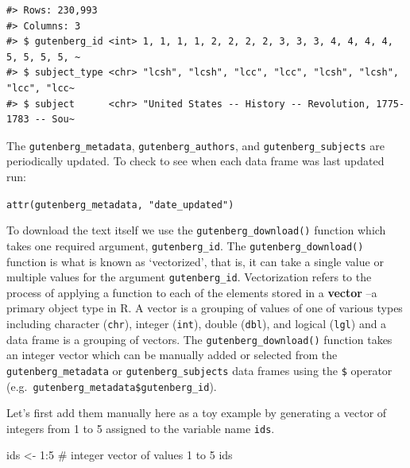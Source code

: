\documentclass[
  letterpaper,
]{latex/krantz}
\newenvironment{Shaded}{\begin{snugshade}}{\end{snugshade}}
\newcommand{\CommentTok}[1]{\textcolor[rgb]{0.37,0.37,0.37}{#1}}
\newcommand{\DecValTok}[1]{\textcolor[rgb]{0.68,0.00,0.00}{#1}}
\newcommand{\NormalTok}[1]{\textcolor[rgb]{0.00,0.23,0.31}{#1}}
\newcommand{\OtherTok}[1]{\textcolor[rgb]{0.00,0.23,0.31}{#1}}
\newcommand{\SpecialCharTok}[1]{\textcolor[rgb]{0.37,0.37,0.37}{#1}}
\begin{document}
\begin{verbatim}
#> Rows: 230,993
#> Columns: 3
#> $ gutenberg_id <int> 1, 1, 1, 1, 2, 2, 2, 2, 3, 3, 3, 4, 4, 4, 4, 5, 5, 5, 5, ~
#> $ subject_type <chr> "lcsh", "lcsh", "lcc", "lcc", "lcsh", "lcsh", "lcc", "lcc~
#> $ subject      <chr> "United States -- History -- Revolution, 1775-1783 -- Sou~
\end{verbatim}

\begin{tcolorbox}[enhanced jigsaw, toprule=.15mm, bottomtitle=1mm, coltitle=black, title=\textcolor{quarto-callout-warning-color}{\faExclamationTriangle}\hspace{0.5em}{Tip}, left=2mm, colframe=quarto-callout-warning-color-frame, bottomrule=.15mm, colbacktitle=quarto-callout-warning-color!10!white, leftrule=.75mm, colback=white, titlerule=0mm, breakable, toptitle=1mm, opacityback=0, arc=.35mm, rightrule=.15mm, opacitybacktitle=0.6]

The \texttt{gutenberg\_metadata}, \texttt{gutenberg\_authors}, and
\texttt{gutenberg\_subjects} are periodically updated. To check to see
when each data frame was last updated run:

\texttt{attr(gutenberg\_metadata,\ "date\_updated")}

\end{tcolorbox}

To download the text itself we use the \texttt{gutenberg\_download()}
function which takes one required argument, \texttt{gutenberg\_id}. The
\texttt{gutenberg\_download()} function is what is known as
`vectorized', that is, it can take a single value or multiple values for
the argument \texttt{gutenberg\_id}. Vectorization refers to the process
of applying a function to each of the elements stored in a
\textbf{vector} --a primary object type in R. A vector is a grouping of
values of one of various types including character (\texttt{chr}),
integer (\texttt{int}), double (\texttt{dbl}), and logical
(\texttt{lgl}) and a data frame is a grouping of vectors. The
\texttt{gutenberg\_download()} function takes an integer vector which
can be manually added or selected from the \texttt{gutenberg\_metadata}
or \texttt{gutenberg\_subjects} data frames using the \texttt{\$}
operator (e.g.~\texttt{gutenberg\_metadata\$gutenberg\_id}).

Let's first add them manually here as a toy example by generating a
vector of integers from 1 to 5 assigned to the variable name
\texttt{ids}.

\begin{Shaded}
\begin{Highlighting}[]
\NormalTok{ids }\OtherTok{\textless{}{-}} \DecValTok{1}\SpecialCharTok{:}\DecValTok{5} \CommentTok{\# integer vector of values 1 to 5}
\NormalTok{ids}
\end{Highlighting}
\end{Shaded}
\end{document}
